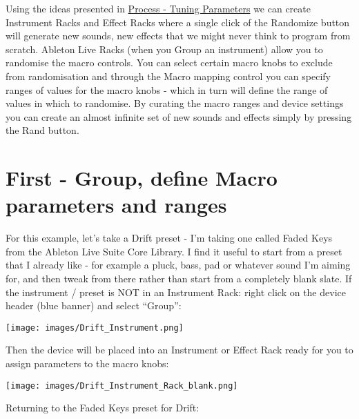 \documentclass[
  12pt,
  letterpaper,
  oneside,
  open=any]{scrbook}
\begin{document}
\begin{tcolorbox}[enhanced jigsaw, arc=.35mm, title=\textcolor{quarto-callout-tip-color}{\faLightbulb}\hspace{0.5em}{Key idea}, colback=white, opacitybacktitle=0.6, coltitle=black, toptitle=1mm, colframe=quarto-callout-tip-color-frame, bottomtitle=1mm, titlerule=0mm, rightrule=.15mm, bottomrule=.15mm, colbacktitle=quarto-callout-tip-color!10!white, toprule=.15mm, breakable, opacityback=0, left=2mm, leftrule=.75mm]

Using the ideas presented in
\hyperref[Chapter-008-Process-Tuning_Parameters]{Process - Tuning
Parameters} we can create Instrument Racks and Effect Racks where a
single click of the Randomize button will generate new sounds, new
effects that we might never think to program from scratch. Ableton Live
Racks (when you Group an instrument) allow you to randomise the macro
controls. You can select certain macro knobs to exclude from
randomisation and through the Macro mapping control you can specify
ranges of values for the macro knobs - which in turn will define the
range of values in which to randomise. By curating the macro ranges and
device settings you can create an almost infinite set of new sounds and
effects simply by pressing the Rand button.

\end{tcolorbox}

\section{First - Group, define Macro parameters and
ranges}\label{first---group-define-macro-parameters-and-ranges}

For this example, let's take a Drift preset - I'm taking one called
Faded Keys from the Ableton Live Suite Core Library. I find it useful to
start from a preset that I already like - for example a pluck, bass, pad
or whatever sound I'm aiming for, and then tweak from there rather than
start from a completely blank slate. If the instrument / preset is NOT
in an Instrument Rack: right click on the device header (blue banner)
and select ``Group'':

\texttt{[image: images/Drift\_Instrument.png]}

Then the device will be placed into an Instrument or Effect Rack ready
for you to assign parameters to the macro knobs:

\texttt{[image: images/Drift\_Instrument\_Rack\_blank.png]}

Returning to the Faded Keys preset for Drift:
\end{document}
